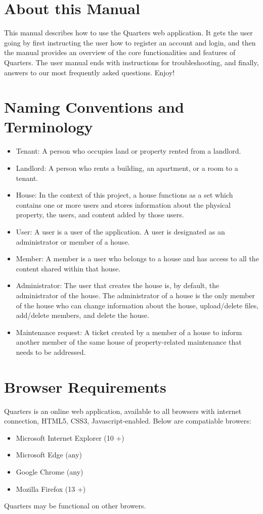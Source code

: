 \documentclass[12pt]{article}
\begin{document}
    \section{About this Manual}
    This manual describes how to use the Quarters web application. It gets the user going by first instructing the user how to register an account and login, and then the manual provides an overview of the core functionalities and features of Quarters. The user manual ends with instructions for troubleshooting, and finally, answers to our most frequently asked questions. Enjoy!
    
    \section{Naming Conventions and Terminology}
    \label{sec:conventions}
    \begin{itemize}
    \item Tenant: A person who occupies land or property rented from a landlord.
    \item Landlord: A person who rents a building, an apartment, or a room to a tenant.
    \item House: In the context of this project, a house functions as a set
      which contains one or more users and stores information about the
      physical property, the users, and content added by those users.
    \item User: A user is a user of the application. A user is designated as an administrator or member of a house.
    \item Member: A member is a user who belongs to a house and has access to all the content shared within that house.
    \item Administrator: The user that creates the house is, by default, the administrator of the house. The administrator of a house is the only member of the house who can change information about the house, upload/delete files, add/delete members, and delete the house.
    \item Maintenance request: A ticket created by a member of a house to inform another member of the same house of property-related maintenance that needs to be addressed.
    \end{itemize}

    \section{Browser Requirements}
    Quarters is an online web application, available to all browsers with internet connection, HTML5, CSS3, Javascript-enabled. Below are compatiable browers:
    \begin{itemize}
        \item Microsoft Internet Explorer (10 +)
        \item Microsoft Edge (any)
        \item Google Chrome (any)
        \item Mozilla Firefox (13 +)
    \end{itemize}
    Quarters may be functional on other browers.
\end{document}

